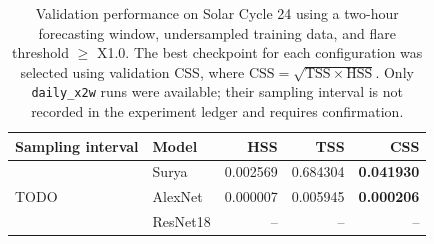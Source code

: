 
\begin{table}[t]
\centering
\caption{Validation performance on Solar Cycle 24 using a two-hour forecasting window, undersampled training data, and flare threshold $\geq$ X1.0. The best checkpoint for each configuration was selected using validation CSS, where $\mathrm{CSS}=\sqrt{\mathrm{TSS}\times\mathrm{HSS}}$. Only \texttt{daily\_x2w} runs were available; their sampling interval is not recorded in the experiment ledger and requires confirmation.}
\label{tab:validation-2h-x}
\small
\begin{tabular}{llrrr}
\toprule
Sampling interval & Model & HSS & TSS & CSS \\
\midrule
\multirow{3}{*}{TODO}
  & Surya    & 0.002569 & 0.684304 & \textbf{0.041930} \\
  & AlexNet  & 0.000007 & 0.005945 & \textbf{0.000206} \\
  & ResNet18 & -- & -- & -- \\
\bottomrule
\end{tabular}
\end{table}
